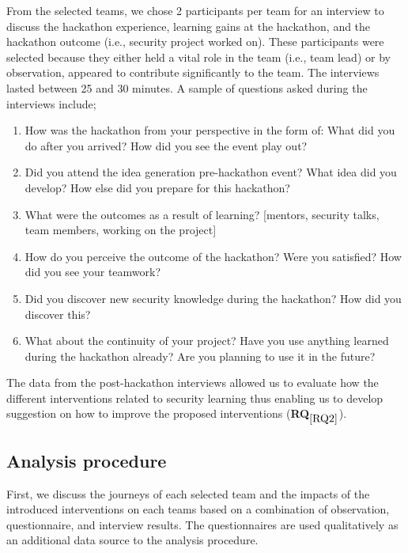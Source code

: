 \documentclass[runningheads]{llncs}
\newcommand{\hr}[1]{\textbf{RQ}$_{\ref{#1}}$}
\begin{document}
From the selected teams, we chose 2 participants per team for an interview to discuss the hackathon experience, learning gains at the hackathon, and the hackathon outcome (i.e., security project worked on). 
These participants were selected because they either held a vital role in the team (i.e., team lead) or by observation, appeared to contribute significantly to the team.
The interviews lasted between 25 and 30 minutes.
A sample of questions asked during the interviews include;
\begin{enumerate}
    \item How was the hackathon from your perspective in the form of: What did you do after you arrived? How did you see the event play out? 
    \item Did you attend the idea generation pre-hackathon event? What idea did you develop? How else did you prepare for this hackathon?
    \item What were the outcomes as a result of learning? [mentors, security talks, team members, working on the project]
    \item How do you perceive the outcome of the hackathon? Were you satisfied? How did you see your teamwork? 
    \item Did you discover new security knowledge during the hackathon? How did you discover this?
    \item What about the continuity of your project? Have you use anything learned during the hackathon already? Are you planning to use it in the future? 
\end{enumerate}
The data from the post-hackathon interviews allowed us to evaluate how the different interventions related to security learning thus enabling us to develop suggestion on how to improve the proposed interventions (\hr{RQ2}).

\subsection{Analysis procedure}\label{Sec:analysisprocedure}
First, we discuss the journeys of each selected team and the impacts of the introduced interventions on each teams based on a combination of observation, questionnaire, and interview results. The questionnaires are used qualitatively as an additional data source to the analysis procedure. %
\end{document}
